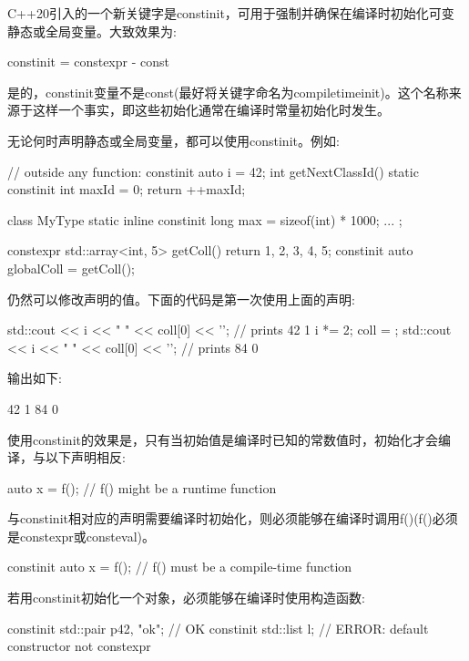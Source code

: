 
C++20引入的一个新关键字是constinit，可用于强制并确保在编译时初始化可变静态或全局变量。大致效果为:

\begin{cpp}
constinit = constexpr - const
\end{cpp}

是的，constinit变量不是const(最好将关键字命名为compiletimeinit)。这个名称来源于这样一个事实，即这些初始化通常在编译时常量初始化时发生。

无论何时声明静态或全局变量，都可以使用constinit。例如:

\begin{cpp}
// outside any function:
constinit auto i = 42;
int getNextClassId() {
	static constinit int maxId = 0;
	return ++maxId;
}

class MyType {
	static inline constinit long max = sizeof(int) * 1000;
	...
};

constexpr std::array<int, 5> getColl() {
	return {1, 2, 3, 4, 5};
}
constinit auto globalColl = getColl();
\end{cpp}

仍然可以修改声明的值。下面的代码是第一次使用上面的声明:

\begin{cpp}
std::cout << i << " " << coll[0] << '\n'; // prints 42 1
i *= 2;
coll = {};
std::cout << i << " " << coll[0] << '\n'; // prints 84 0
\end{cpp}

输出如下:

\begin{shell}
42 1
84 0
\end{shell}

使用constinit的效果是，只有当初始值是编译时已知的常数值时，初始化才会编译，与以下声明相反:

\begin{cpp}
auto x = f(); // f() might be a runtime function
\end{cpp}

与constinit相对应的声明需要编译时初始化，则必须能够在编译时调用f()(f()必须是constexpr或consteval)。

\begin{cpp}
constinit auto x = f(); // f() must be a compile-time function
\end{cpp}

若用constinit初始化一个对象，必须能够在编译时使用构造函数:

\begin{cpp}
constinit std::pair p{42, "ok"}; // OK constinit std::list l; // ERROR: default constructor not constexpr
\end{cpp}

